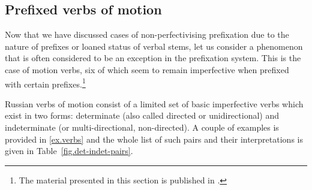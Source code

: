 
\subsection{Prefixed verbs of motion}\label{subsection:perf:motion}

Now that we have discussed cases of non-perfectivising   prefixation  due to the nature of prefixes or loaned   status of verbal stems, let us consider a phenomenon that is often considered to be an exception in the prefixation  system. This is the case of motion verbs, six of which seem to remain imperfective    when prefixed with certain prefixes.\footnote{The material presented in this section is published in \cite{ZinovaOsswald:paper}.}

Russian verbs of motion consist of a limited set of basic imperfective verbs  which exist in two forms: determinate (also called directed or unidirectional) and indeterminate (or multi-directional, non-directed). A couple of examples is provided in \ref{ex.verbs} and the whole list of such pairs and their interpretations is given in Table~\ref{fig.det-indet-pairs}.

